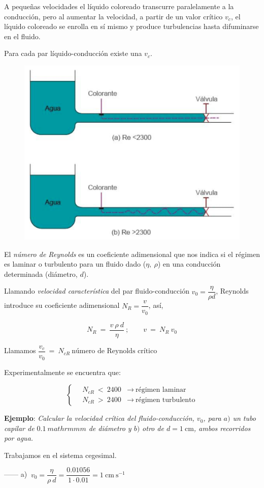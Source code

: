 \begin{multicols}{2}
A pequeñas velocidades el líquido coloreado transcurre paralelamente a la conducción, pero al aumentar la velocidad, a partir de un valor crítico $v_c$, el líquido coloreado se enrolla en sí mismo y produce turbulencias hasta difuminarse en el fluido.

Para cada par líquido-conducción existe una $v_c$.
\begin{figure}[H]
	\centering
	\includegraphics[width=.4\textwidth]{imagenes/imagenes18/T18IM12.png}
	\end{figure}
\end{multicols}


El \emph{número de Reynolds} es un coeficiente adimensional que nos indica si el régimen es laminar o turbulento para un fluido dado ($\eta,\ \rho$) en una conducción determinada (diámetro, $d$).

Llamando \emph{velocidad característica} del par fluido-conducción $v_0=\dfrac{\eta}{\rho d}$, Reynolds introduce su coeficiente adimensional $N_R=\dfrac {v}{v_0}$, así, 


$$N_R\ = \ \dfrac{v\ \rho \ d}{\eta} \ ; \qquad v\ = \ N_R\ v_0$$

Llamamos $\dfrac{v_c}{v_0}\ = \ N_{cR}\ \text{número de Reynolds crítico}$

Experimentalmente se encuentra que:

$$\begin{cases} \quad N_{cR}\ < \ 2400 & \to \ \text{régimen laminar}  \\  \quad N_{cR}\ > \ 2400 & \to \ \text{régimen turbulento}  \end{cases}$$

\textbf{Ejemplo}: \emph{Calcular la velocidad crítica del fluido-conducción, $v_0$, para $a)$ un tubo capilar de $0.1\ mathrm{mm}$ de diámetro y $b)$ otro de $d=1\ \mathrm{cm}$, ambos recorridos por agua.}

Trabajamos en el sistema cegesimal.

------ a) $\ v_0=\dfrac {\eta}{\rho \ d}=\dfrac{0.01056}{1\cdot 0.01}=1 \ \mathrm{cm\ s}^{-1}$

